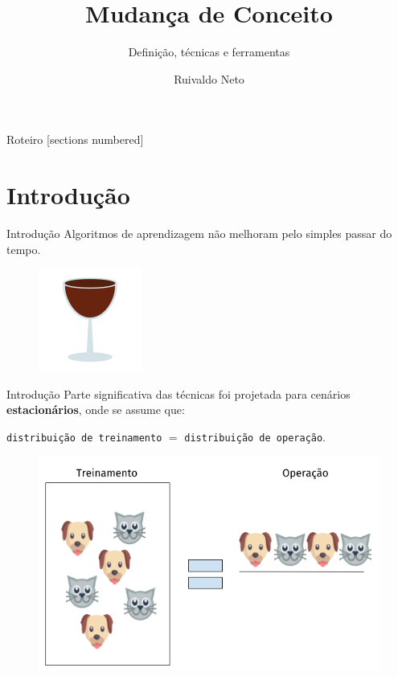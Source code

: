 \documentclass[10pt]{beamer}
\title{Mudança de Conceito}
\subtitle{Definição, técnicas e ferramentas}
\date{}
\author{Ruivaldo Neto}
\institute{UFBA - PGCOMP}
\begin{document}
\maketitle

\begin{frame}{Roteiro}
  [sections numbered]
  \begin{minipage}{\textwidth}
    \tableofcontents
  \end{minipage}
\end{frame}

\section{Introdução}

\begin{frame}{Introdução}
    Algoritmos de aprendizagem não melhoram pelo simples passar do tempo.

    \begin{figure}[H]
        \begin{center}
            \includegraphics[scale=0.8]{wine.png}
        \end{center}
    \end{figure}
\end{frame}

\begin{frame}{Introdução}
    Parte significativa das técnicas foi projetada para cenários \textbf{estacionários}, 
    onde se assume que: 
    
    \texttt{distribuição de treinamento} $=$ \texttt{distribuição de operação}.

    \begin{figure}[H]
        \begin{center}
            \includegraphics[scale=0.5]{treinamento_operacao_estacionario.png}
        \end{center}
    \end{figure}
\end{frame}
\end{document}
